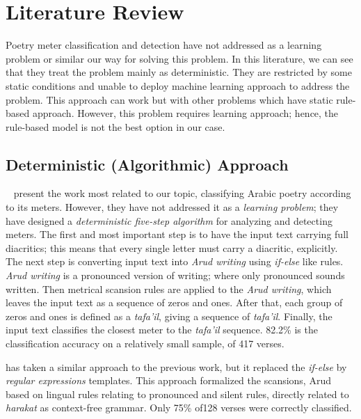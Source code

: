 \chapter{Literature Review}\label{Ch:Literature}

Poetry meter classification and detection have not addressed as a learning problem or similar our way for solving this problem. In this literature, we can see that they treat the problem mainly as deterministic. They are restricted by some static conditions and unable to deploy machine learning approach to address the problem. This approach can work but with other problems which have static rule-based approach. However, this problem requires learning approach; hence, the rule-based model is not the best option in our case.



\section{Deterministic (Algorithmic) Approach}\label{sec:Determ_Algor_Appr}

~\cite{Abuata2016RuleBasedAlgorithm} present the work most related to our topic, classifying Arabic poetry according to its meters. However, they have not addressed it as a \textit{learning problem}; they have designed a \textit{deterministic five-step algorithm} for analyzing and detecting meters. The first and most important step is to have the input text carrying full diacritics; this means that every single letter must carry a diacritic, explicitly. The next step is converting input text into \textit{Arud writing} using \textit{if-else} like rules. \textit{Arud writing} is a pronounced version of writing; where only pronounced sounds written. Then metrical scansion rules are applied to the \textit{Arud writing}, which leaves the input text as a sequence of zeros and ones. After that, each group of zeros and ones is defined as a \textit{tafa'il}, giving a sequence of \textit{tafa'il}. Finally, the input text classifies the closest meter to the \textit{tafa'il} sequence. 82.2\% is the classification accuracy on a relatively small sample, of 417 verses.

\cite{Alnagdawi2013FindingArabicPoemMeter} has taken a similar approach to the previous work, but it replaced the \textit{if-else} by \textit{regular expressions} templates. This approach formalized the scansions, Arud based on lingual rules relating to pronounced and silent rules, directly related to \textit{harakat} as context-free grammar. Only 75\% of128 verses were correctly classified. 

